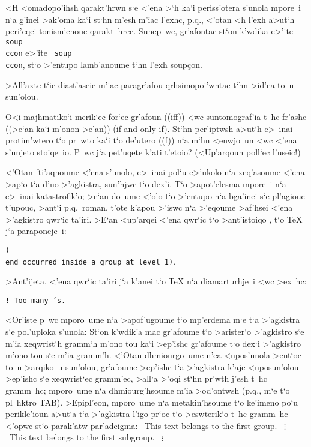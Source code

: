 <H <omadopo'ihsh qarakt'hrwn s`e <'ena >`h ka`i periss'otera s'unola
mpore~i n`a g'inei >ak'oma ka`i st`hn m'esh m'iac l'exhc, p.q., <'otan
<h l'exh a>ut`h peri'eqei tonism'enouc qarakt~hrec.  Sunep~wc,
gr'afontac st`on k'wdika e>'ite {\tt soup\\c\sp con} e>'ite {\tt
soup\\c\lb c\rb on}, st`o >'entupo lamb'anoume t`hn l'exh {\rm
soup\c{c}on}.

\exercise >All'axte t`ic diast'aseic m'iac paragr'afou qrhsimopoi'wntac
t`hn >id'ea to~u sun'olou.

\exercise O<i majhmatiko`i merik`ec for`ec gr'afoun (({\rm i{f}f})) <wc 
suntomograf'ia t~hc fr'ashc ((>e`an ka`i m'onon >e'an)) ({\rm if and
only if}).  St`hn per'iptwsh a>ut`h e>~inai protim'wtero t`o pr~wto ka`i
t`o de'utero (({\rm f})) n`a m`hn <enwjo~un <wc <'ena s'unjeto
stoiqe~io.  P~wc j`a pet'uqete k'ati t'etoio? (<Up'arqoun poll`ec
l'useic!)

\bigskip

<'Otan fti'aqnoume <'ena s'unolo, e>~inai pol`u e>'ukolo n`a xeq'asoume
<'ena >ap`o t`a d'uo >'agkistra, sun'hjwc t`o dex'i.  T`o >apot'elesma
mpore~i n`a e>~inai katastrofik'o; >e`an do~ume <'olo t`o >'entupo n`a
bga'inei s`e pl'agiouc t'upouc, >ant`i p.q.\ {\rm roman}, t'ote k'apou
>'iswc n`a >'eqoume >af'hsei <'ena >'agkistro qwr`ic ta'iri.  >E`an
<up'arqei <'ena {\tt\lb} qwr`ic t`o >ant'istoiqo {\tt\rb}, t`o {\rm
\TeX} j`a paraponeje~i: 

{\tt (\\end occurred inside a group at level 1)}. 

>Ant'ijeta, <'ena {\tt\rb} qwr`ic ta'iri j`a k'anei t`o {\rm \TeX}
n`a dia\-mar\-turh\-je~i <wc >ex~hc: 

{\tt! Too many \rb's.}

<Or'iste p~wc mporo~ume n`a >apof'ugoume t`o mp'erdema m`e t`a
>'agkistra s`e pol'uploka s'unola: St`on k'wdik'a mac gr'afoume t`o
>arister`o >'agkistro s`e m'ia xeqwrist`h gramm`h m'ono tou ka`i
>ep'ishc gr'afoume t`o dex`i >'agkistro m'ono tou s`e m'ia gramm'h. 
<'Otan dhmiourgo~ume n'ea <upo\-s'u\-nola >ent`oc to~u >arqiko~u
sun'olou, gr'afoume >ep'ishc t`a >'agkistra k'aje <uposun'olou >ep'ishc
s`e xeqwrist`ec gramm'ec, >all`a >'oqi st`hn pr'wth j'esh t~hc gramm~hc;
mporo~ume n`a dhmiourg'hsoume m'ia >od'ontwsh (p.q., m`e t`o pl~hktro
{\rm TAB})\null.  >Epipl'eon, mporo~ume n`a metakin'hsoume t`o ke'imeno
po`u perikle'ioun a>ut`a t`a >'agkistra l'igo pr`oc t`o >eswterik`o t~hc
gramm~hc <'opwc st`o parak'atw par'adeigma:
\beginuser \obeyspaces 
\lb
\    This text belongs to the first group. 
\    $\vdots$
\    \lb
\         This text belongs to the first subgroup.
\         $\vdots$
\    \rb
\rb
\enduser

